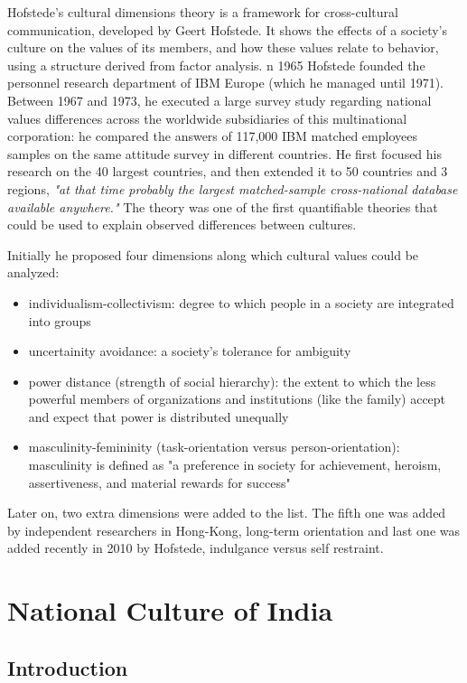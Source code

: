 \documentclass{article}
\begin{document}
Hofstede's cultural dimensions theory \cite{ref:Hofstede's cultural dimensions theory} is a framework for cross-cultural communication, developed by Geert Hofstede. It shows the effects of a society's culture on the values of its members, and how these values relate to behavior, using a structure derived from factor analysis. n 1965 Hofstede founded the personnel research department of IBM Europe (which he managed until 1971). Between 1967 and 1973, he executed a large survey study regarding national values differences across the worldwide subsidiaries of this multinational corporation: he compared the answers of 117,000 IBM matched employees samples on the same attitude survey in different countries. He first focused his research on the 40 largest countries, and then extended it to 50 countries and 3 regions, \textit{"at that time probably the largest matched-sample cross-national database available anywhere."} The theory was one of the first quantifiable theories that could be used to explain observed differences between cultures.

Initially he proposed four dimensions along which cultural values could be analyzed: 
\begin{itemize}
    \item individualism-collectivism: degree to which people in a society are integrated into groups
    \item uncertainity avoidance: a society's tolerance for ambiguity
    \item power distance (strength of social hierarchy): the extent to which the less powerful members of organizations and institutions (like the family) accept and expect that power is distributed unequally
    \item masculinity-femininity (task-orientation versus person-orientation): masculinity is defined as "a preference in society for achievement, heroism, assertiveness, and material rewards for success"
\end{itemize}
Later on, two extra dimensions were added to the list. The fifth one was added by independent researchers in Hong-Kong, long-term orientation and last one was added recently in 2010 by Hofstede, indulgance versus self restraint.

\section{National Culture of India}

\subsection{Introduction}
\end{document}
